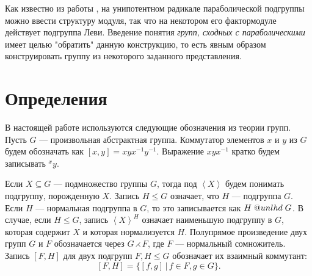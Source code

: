 \documentclass[12pt]{matmex-diploma}
\makeatletter
\newcommand{\slunlhd}{%
  \mathrel{\mathpalette\sl@unlhd\relax}%
}
\newcommand{\sl@unlhd}[2]{%
  \sbox\z@{$#1\lhd$}%
  \sbox\tw@{$#1\leqslant$}%
  \dimen@=\ht\tw@
  \advance\dimen@-\ht\z@
  \ifx#1\displaystyle
    \advance\dimen@ .2pt
  \else
    \ifx#1\textstyle
      \advance\dimen@ .2pt
    \fi
  \fi
  \ooalign{\raisebox{\dimen@}{$\m@th#1\lhd$}\cr$\m@th#1\leqslant$\cr}%
}
\theoremstyle{mystyleni}
\theoremstyle{mystyle}
\newtheorem{definition}{Определение}
\renewcommand{\le}{\leqslant}
\renewcommand{\trianglelefteq}{\slunlhd}
\makeatother
\begin{document}
Как известно из работы \citep{Azad1990}, на унипотентном радикале параболической подгруппы можно ввести структуру модуля, так что на некотором его фактормодуле действует подгруппа Леви. Введение понятия \emph{групп, сходных с параболическими} имеет целью "обратить" данную конструкцию, то есть явным образом конструировать группу из некоторого заданного представления.

\pagebreak
\section{Определения}

\begin{comment}
Следующие три определения широко известны и приведены, например, в работах \cite{Conrad11reductivegroup}, \#, \#.
\begin{definition} 
Редуктивной $R$-группой называется линейная алгебраическая $R$-группа, не содержащая нетривиальных связных нормальных унипотентных линейных алгебраических $R$-подгрупп.
\end{definition}

\begin{definition}
Полупростой $R$-группой называется линейная алгебраическая $R$-группа, не содержащая нетривиальных связных нормальных разрешимых линейных алгебраических $R$-подгрупп.
\end{definition}

\begin{definition}
Простой $R$-группой называется линейная алгебраическая $R$-группа, не содержащая нетривиальных связных нормальных линейных алгебраических $R$-подгрупп.
\end{definition}
\end{comment}

В настоящей работе используются следующие обозначения из теории групп.\linebreak
Пусть $G$ --- произвольная абстрактная группа. Коммутатор элементов $x$ и $y$ из $G$ будем обозначать как $[x,y]=x y x^{-1} y^{-1}$.
Выражение $x y x^{-1}$ кратко будем записывать ${}^x y$.

Если $X \subseteq G$ --- подмножество группы $G$, тогда под $\left<X\right>$ будем понимать подгруппу, порожденную $X$.
Запись $H\le G$ означает, что $H$ --- подгруппа $G$.
Если $H$ --- нормальная подгруппа в $G$, то это записывается как $H \trianglelefteq G$. В случае, если $H \le G$, запись $\left<X\right>^H$ означает наименьшую подгруппу в $G$, которая содержит $X$ и которая нормализуется $H$.
Полупрямое произведение двух групп $G$ и $F$ обозначается через $G\rightthreetimes F$, где $F$ --- нормальный сомножитель.
Запись $[F,H]$ для двух подгрупп $F,H \le G$ обозначает их взаимный коммутант:
$$ [F,H] = \{[f,g] \, | \, f\in F, g \in G  \} .$$
\end{document}

